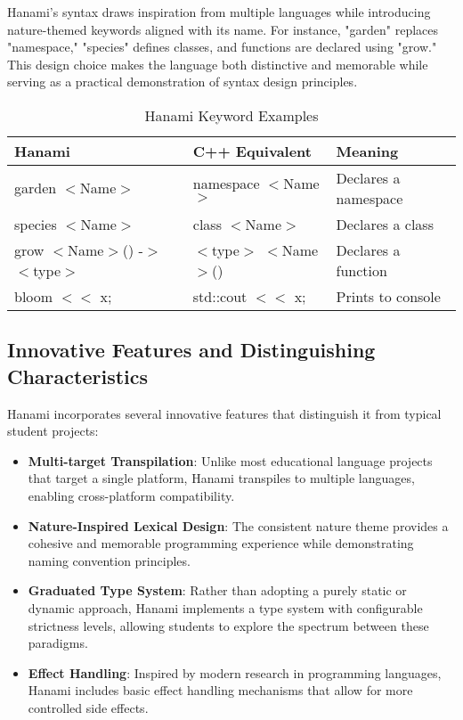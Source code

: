 \documentclass[conference]{IEEEtran}
\begin{document}
	Hanami's syntax draws inspiration from multiple languages while introducing nature-themed keywords aligned with its name. For instance, "garden" replaces "namespace," "species" defines classes, and functions are declared using "grow." This design choice makes the language both distinctive and memorable while serving as a practical demonstration of syntax design principles.
	
	\begin{table}[!t]
		\caption{Hanami Keyword Examples}
		\label{table:keywords}
		\centering
		\begin{tabular}{|l|l|l|}
			\hline
			\textbf{Hanami} & \textbf{C++ Equivalent} & \textbf{Meaning} \\
			\hline
			garden $<$Name$>$ & namespace $<$Name$>$ & Declares a namespace \\
			\hline
			species $<$Name$>$ & class $<$Name$>$ & Declares a class \\
			\hline
			grow $<$Name$>$() -$>$ $<$type$>$ & $<$type$>$ $<$Name$>$() & Declares a function \\
			\hline
			bloom $<<$ x; & std::cout $<<$ x; & Prints to console \\
			\hline
		\end{tabular}
	\end{table}
	
	\subsection{Innovative Features and Distinguishing Characteristics}
	
	Hanami incorporates several innovative features that distinguish it from typical student projects:
	
	\begin{itemize}
		\item \textbf{Multi-target Transpilation}: Unlike most educational language projects that target a single platform, Hanami transpiles to multiple languages, enabling cross-platform compatibility.
		
		\item \textbf{Nature-Inspired Lexical Design}: The consistent nature theme provides a cohesive and memorable programming experience while demonstrating naming convention principles.
		
		\item \textbf{Graduated Type System}: Rather than adopting a purely static or dynamic approach, Hanami implements a type system with configurable strictness levels, allowing students to explore the spectrum between these paradigms.
		
		\item \textbf{Effect Handling}: Inspired by modern research in programming languages, Hanami includes basic effect handling mechanisms that allow for more controlled side effects.
	\end{itemize}
	
\end{document}
